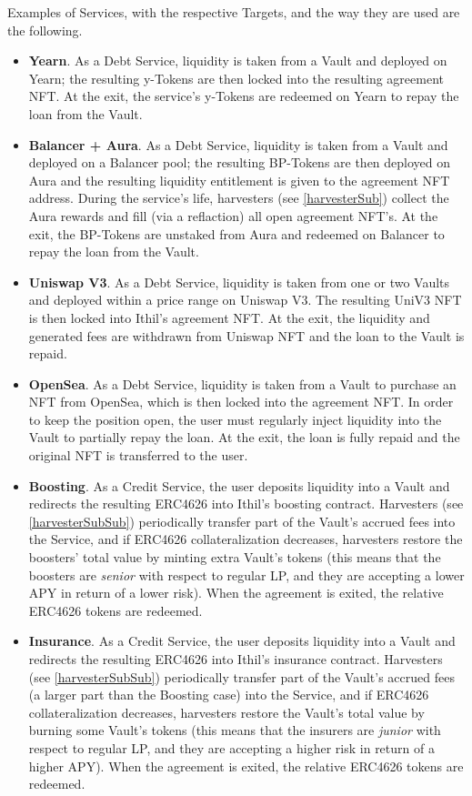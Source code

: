 \documentclass[a4paper,10 pt]{article}
\theoremstyle{definition}
\begin{document}
Examples of Services, with the respective Targets, and the way they are used are the following.
\begin{itemize}
\item {\bf Yearn}. As a Debt Service, liquidity is taken from a Vault and deployed on Yearn; the resulting y-Tokens are then locked into the resulting agreement NFT. At the exit, the service's y-Tokens are redeemed on Yearn to repay the loan from the Vault.

\item {\bf Balancer + Aura}. As a Debt Service, liquidity is taken from a Vault and deployed on a Balancer pool; the resulting BP-Tokens are then deployed on Aura and the resulting liquidity entitlement is given to the agreement NFT address. During the service's life, harvesters (see \ref{harvesterSub}) collect the Aura rewards and fill (via a reflaction) all open agreement NFT's. At the exit, the BP-Tokens are unstaked from Aura and redeemed on Balancer to repay the loan from the Vault.

\item {\bf Uniswap V3}. As a Debt Service, liquidity is taken from one or two Vaults and deployed within a price range on Uniswap V3. The resulting UniV3 NFT is then locked into Ithil's agreement NFT. At the exit, the liquidity and generated fees are withdrawn from Uniswap NFT and the loan to the Vault is repaid.

\item {\bf OpenSea}. As a Debt Service, liquidity is taken from a Vault to purchase an NFT from OpenSea, which is then locked into the agreement NFT. In order to keep the position open, the user must regularly inject liquidity into the Vault to partially repay the loan. At the exit, the loan is fully repaid and the original NFT is transferred to the user.

\item {\bf Boosting}. As a Credit Service, the user deposits liquidity into a Vault and redirects the resulting ERC4626 into Ithil's boosting contract. Harvesters (see \ref{harvesterSubSub}) periodically transfer part of the Vault's accrued fees into the Service, and if ERC4626 collateralization decreases, harvesters restore the boosters' total value by minting extra Vault's tokens (this means that the boosters are {\it senior} with respect to regular LP, and they are accepting a lower APY in return of a lower risk). When the agreement is exited, the relative ERC4626 tokens are redeemed.

\item {\bf Insurance}. As a Credit Service, the user deposits liquidity into a Vault and redirects the resulting ERC4626 into Ithil's insurance contract.  Harvesters (see \ref{harvesterSubSub}) periodically transfer part of the Vault's accrued fees (a larger part than the Boosting case) into the Service,  and if ERC4626 collateralization decreases, harvesters restore the Vault's total value by burning some Vault's tokens  (this means that the insurers are {\it junior} with respect to regular LP, and they are accepting a higher risk in return of a higher APY). When the agreement is exited, the relative ERC4626 tokens are redeemed.


\end{itemize}
\end{document}
